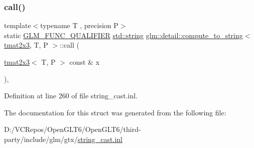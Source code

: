 \subsubsection{\texorpdfstring{call()}{call()}}
{\footnotesize\ttfamily template$<$typename T , precision P$>$ \\
static \mbox{\hyperlink{setup_8hpp_a33fdea6f91c5f834105f7415e2a64407}{G\+L\+M\+\_\+\+F\+U\+N\+C\+\_\+\+Q\+U\+A\+L\+I\+F\+I\+ER}} \mbox{\hyperlink{glad_8h_ac83513893df92266f79a515488701770}{std\+::string}} \mbox{\hyperlink{structglm_1_1detail_1_1compute__to__string}{glm\+::detail\+::compute\+\_\+to\+\_\+string}}$<$ \mbox{\hyperlink{structglm_1_1tmat2x3}{tmat2x3}}, T, P $>$\+::call (\begin{DoxyParamCaption}\item[{\mbox{\hyperlink{structglm_1_1tmat2x3}{tmat2x3}}$<$ T, P $>$ const \&}]{x }\end{DoxyParamCaption})\hspace{0.3cm}{\ttfamily [inline]}, {\ttfamily [static]}}



Definition at line 260 of file string\+\_\+cast.\+inl.



The documentation for this struct was generated from the following file\+:\begin{DoxyCompactItemize}
\item 
D\+:/\+V\+C\+Repos/\+Open\+G\+L\+T6/\+Open\+G\+L\+T6/third-\/party/include/glm/gtx/\mbox{\hyperlink{string__cast_8inl}{string\+\_\+cast.\+inl}}\end{DoxyCompactItemize}
